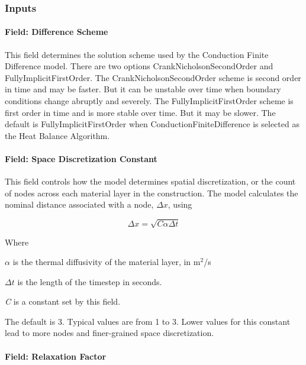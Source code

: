 \subsubsection{Inputs}\label{inputs-7-025}

\paragraph{Field: Difference Scheme}\label{field-difference-scheme}

This field determines the solution scheme used by the Conduction Finite Difference model. There are two options CrankNicholsonSecondOrder and FullyImplicitFirstOrder. The CrankNicholsonSecondOrder scheme is second order in time and may be faster. But it can be unstable over time when boundary conditions change abruptly and severely. The FullyImplicitFirstOrder scheme is first order in time and is more stable over time. But it may be slower. The default is FullyImplicitFirstOrder when ConductionFiniteDifference is selected as the Heat Balance Algorithm.

\paragraph{Field: Space Discretization Constant}\label{field-space-discretization-constant}

This field controls how the model determines spatial discretization, or the count of nodes across each material layer in the construction. The model calculates the nominal distance associated with a node, \(\Delta x\), using

\begin{equation}
\Delta x = \sqrt {C\alpha \Delta t}
\end{equation}

Where

\(\alpha\) is the thermal diffusivity of the material layer, in m\(^{2}\)/s

\(\Delta t\) is the length of the timestep in seconds.

\emph{C} is a constant set by this field.

The default is 3. Typical values are from 1 to 3. Lower values for this constant lead to more nodes and finer-grained space discretization.

\paragraph{Field: Relaxation Factor}\label{field-relaxation-factor}


